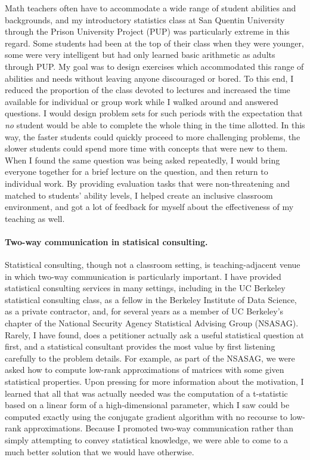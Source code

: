 Math teachers often have to accommodate a wide range of student abilities and
backgrounds, and my introductory statistics class at San Quentin University
through the Prison University Project (PUP) was particularly extreme in this
regard.  Some students had been at the top of their class when they were
younger, some were very intelligent but had only learned basic arithmetic as
adults through PUP.  My goal was to design exercises which accommodated this
range of abilities and needs without leaving anyone discouraged or bored. To
this end, I reduced the proportion of the class devoted to lectures and
increased the time available for individual or group work while I walked around
and answered questions.  I would design problem sets for such periods with the
expectation that \emph{no} student would be able to complete the whole thing in
the time allotted. In this way, the faster students could quickly proceed to
more challenging problems, the slower students could spend more time with
concepts that were new to them. When I found the same question was being asked
repeatedly, I would bring everyone together for a brief lecture on the question,
and then return to individual work.  By providing evaluation tasks that were
non-threatening and matched to students' ability levels, I helped create an
inclusive classroom environment, and got a lot of feedback for myself about the
effectiveness of my teaching as well.

\paragraph{Two-way communication in statisical consulting.}

Statistical consulting, though not a classroom setting, is teaching-adjacent
venue in which two-way communication is particularly important. I have provided
statistical consulting services in many settings, including in the UC Berkeley
statistical consulting class, as a fellow in the Berkeley Institute of Data
Science, as a private contractor, and, for several years as a member of UC
Berkeley's chapter of the National Security Agency Statistical Advising Group
(NSASAG).  Rarely, I have found, does a petitioner actually ask a useful
statistical question at first, and a statistical consultant provides the most
value by first listening carefully to the problem details.  For example, as part
of the NSASAG, we were asked how to compute low-rank approximations of matrices
with some given statistical properties.  Upon pressing for more information
about the motivation, I learned that all that was actually needed was the
computation of a t-statistic based on a linear form of a high-dimensional
parameter, which I saw could be computed exactly using the conjugate gradient
algorithm with no recourse to low-rank approximations.  Because I promoted
two-way communication rather than simply attempting to convey statistical
knowledge, we were able to come to a much better solution that we would have
otherwise.

